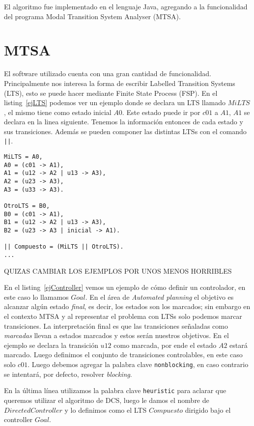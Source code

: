 
El algoritmo fue implementado en el lenguaje Java, agregando a la funcionalidad del programa Modal Transition System Analyser (MTSA)\cite{mtsaRepo}.

\section{MTSA}
El software utilizado cuenta con una gran cantidad de funcionalidad. Principalmente nos interesa la forma de escribir Labelled Transition Systems (LTS), esto se puede hacer mediante Finite State Process (FSP). En el listing~\ref{ejLTS} podemos ver un ejemplo donde se declara un LTS llamado $MiLTS$, el mismo tiene como estado inicial $A0$. Este estado puede ir por $c01$ a $A1$, $A1$ se declara en la linea siguiente. Tenemos la información entonces de cada estado y sus transiciones. Además se pueden componer las distintas LTSs con el comando \texttt{||}.

\begin{lstlisting}[language = mtsa, caption=Ejemplo de LTS y composición, label=ejLTS]
MiLTS = A0,
A0 = (c01 -> A1),
A1 = (u12 -> A2 | u13 -> A3),
A2 = (u23 -> A3),
A3 = (u33 -> A3).

OtroLTS = B0,
B0 = (c01 -> A1),
B1 = (u12 -> A2 | u13 -> A3),
B2 = (u23 -> A3 | inicial -> A1).

|| Compuesto = (MiLTS || OtroLTS).
...
\end{lstlisting}
QUIZAS CAMBIAR LOS EJEMPLOS POR UNOS MENOS HORRIBLES

En el listing~\ref{ejController} vemos un ejemplo de cómo definir un controlador, en este caso lo llamamos $Goal$. En el área de \textit{Automated planning} el objetivo es alcanzar algún estado \textit{final}, es decir, los estados son los marcados; sin embargo en el contexto MTSA y al representar el problema con LTSs solo podemos marcar transiciones. La interpretación final es que las transiciones señaladas como \textit{marcadas} llevan a estados marcados y estos serán nuestros objetivos. En el ejemplo se declara la transición $u12$ como marcada, por ende el estado $A2$ estará marcado. Luego definimos el conjunto de transiciones controlables, en este caso solo $c01$. Luego debemos agregar la palabra clave \texttt{nonblocking}, en caso contrario se intentará, por defecto, resolver \textit{blocking}.

En la última línea utilizamos la palabra clave \texttt{heuristic} para aclarar que queremos utilizar el algoritmo de DCS, luego le damos el nombre de $DirectedController$ y lo definimos como el LTS $Compuesto$ dirigido bajo el controller $Goal$.

